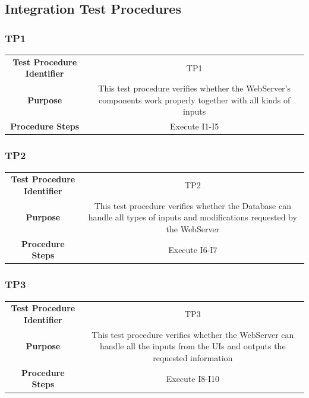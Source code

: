 \documentclass{article}
\begin{document}
\subsection{Integration Test Procedures}
\subsubsection{TP1}
\begin{adjustbox}{width=1.2\textwidth}	
	\begin{tabular}{*{2}{c}}
		\midrule
		\textbf{Test Procedure Identifier} & TP1\\
		\textbf{Purpose} & This test procedure verifies whether the WebServer's components work properly together with all kinds of inputs\\ 
		\textbf{Procedure Steps} & Execute I1-I5\\
		\bottomrule
	\end{tabular}
\end{adjustbox}
\subsubsection{TP2}
\begin{adjustbox}{width=1.2\textwidth}	
	\begin{tabular}{*{2}{c}}
		\midrule
		\textbf{Test Procedure Identifier} & TP2\\
		\textbf{Purpose} & This test procedure verifies whether the Database can handle all types of inputs and modifications requested by the WebServer\\ 
		\textbf{Procedure Steps} & Execute I6-I7\\
		\bottomrule
	\end{tabular}
\end{adjustbox}
\subsubsection{TP3}
\begin{adjustbox}{width=1.2\textwidth}	
	\begin{tabular}{*{2}{c}}
		\midrule
		\textbf{Test Procedure Identifier} & TP3\\
		\textbf{Purpose} & This test procedure verifies whether the WebServer can handle all the inputs from the UIs and outputs the requested information\\ 
		\textbf{Procedure Steps} & Execute I8-I10\\
		\bottomrule
	\end{tabular}
\end{adjustbox}
\end{document}
